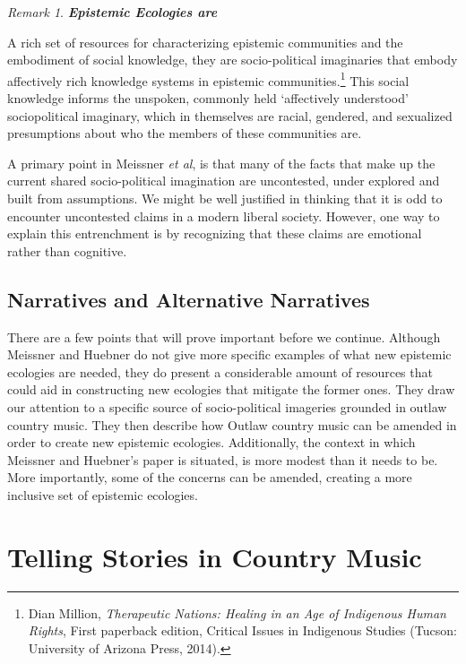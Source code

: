 \documentclass[phdthesis,12pt,final]{wuthesis}
\theoremstyle{definition}
\theoremstyle{definition}
\theoremstyle{definition}
\theoremstyle{definition}
\theoremstyle{remark}
\newtheorem*{remark}{Remark}
\begin{document}
\begin{remark}
\textbf{\emph{Epistemic Ecologies are}}

A rich set of resources for characterizing epistemic communities and the embodiment of social knowledge, they are socio-political imaginaries that embody affectively rich knowledge systems in epistemic communities.\footnote{Dian Million, \emph{Therapeutic {Nations}: {Healing} in an {Age} of {Indigenous Human Rights}}, First paperback edition, Critical {Issues} in {Indigenous Studies} (Tucson: University of Arizona Press, 2014).} This social knowledge informs the unspoken, commonly held `affectively understood' sociopolitical imaginary, which in themselves are racial, gendered, and sexualized presumptions about who the members of these communities are.
\end{remark}

A primary point in Meissner \emph{et al}, is that many of the facts that make up the current shared socio-political imagination are uncontested, under explored and built from assumptions. We might be well justified in thinking that it is odd to encounter uncontested claims in a modern liberal society. However, one way to explain this entrenchment is by recognizing that these claims are emotional rather than cognitive.

\subsection{Narratives and Alternative Narratives}\label{narratives-and-alternative-narratives}

There are a few points that will prove important before we continue. Although Meissner and Huebner do not give more specific examples of what new epistemic ecologies are needed, they do present a considerable amount of resources that could aid in constructing new ecologies that mitigate the former ones. They draw our attention to a specific source of socio-political imageries grounded in outlaw country music. They then describe how Outlaw country music can be amended in order to create new epistemic ecologies. Additionally, the context in which Meissner and Huebner's paper is situated, is more modest than it needs to be. More importantly, some of the concerns can be amended, creating a more inclusive set of epistemic ecologies.

\section{Telling Stories in Country Music}\label{telling-stories-in-country-music}
\end{document}
